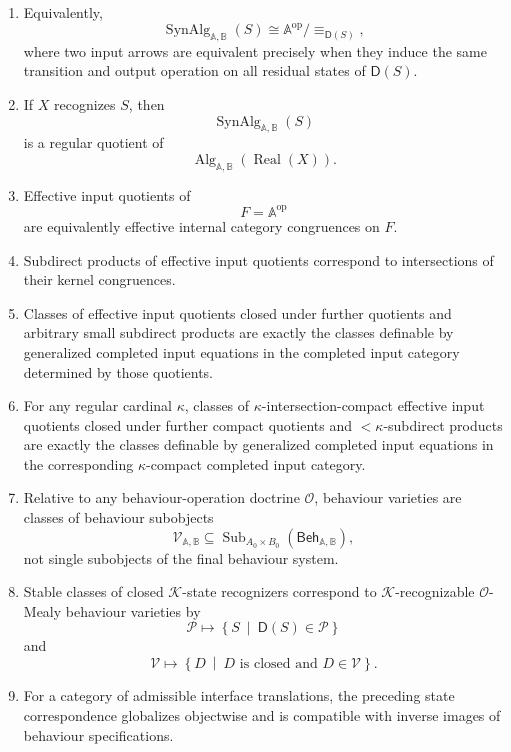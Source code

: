 \begin{theorem}
\begin{enumerate}
\item Equivalently,
\[
\operatorname{SynAlg}_{\mathbb A,\mathbb B}(S)
\cong
\mathbb A^{\mathrm{op}}/{\equiv_{\mathsf D(S)}},
\]
where two input arrows are equivalent precisely when they induce the same
transition and output operation on all residual states of \(\mathsf D(S)\).

\item If \(X\) recognizes \(S\), then
\[
\operatorname{SynAlg}_{\mathbb A,\mathbb B}(S)
\]
is a regular quotient of
\[
\operatorname{Alg}_{\mathbb A,\mathbb B}(\operatorname{Real}(X)).
\]

\item Effective input quotients of
\[
F=\mathbb A^{\mathrm{op}}
\]
are equivalently effective internal category congruences on \(F\).

\item Subdirect products of effective input quotients correspond to
intersections of their kernel congruences.

\item Classes of effective input quotients closed under further quotients and
arbitrary small subdirect products are exactly the classes definable by
generalized completed input equations in the completed input category
determined by those quotients.

\item For any regular cardinal \(\kappa\), classes of
\(\kappa\)-intersection-compact effective input quotients closed under
further compact quotients and \(<\kappa\)-subdirect products are exactly the
classes definable by generalized completed input equations in the
corresponding \(\kappa\)-compact completed input category.

\item Relative to any behaviour-operation doctrine \(\mathcal O\), behaviour
varieties are classes of behaviour subobjects
\[
\mathcal V_{\mathbb A,\mathbb B}
\subseteq
\operatorname{Sub}_{A_0\times B_0}
(\mathsf{Beh}_{\mathbb A,\mathbb B}),
\]
not single subobjects of the final behaviour system.

\item Stable classes of closed \(\mathcal K\)-state recognizers correspond to
\(\mathcal K\)-recognizable \(\mathcal O\)-Mealy behaviour varieties by
\[
\mathcal P
\longmapsto
\left\{
S
\ \middle|\
\mathsf D(S)\in\mathcal P
\right\}
\]
and
\[
\mathcal V
\longmapsto
\left\{
D
\ \middle|\
D\text{ is closed and }D\in\mathcal V
\right\}.
\]

\item For a category of admissible interface translations, the preceding
state correspondence globalizes objectwise and is compatible with inverse
images of behaviour specifications.


\end{enumerate}
\end{theorem}
